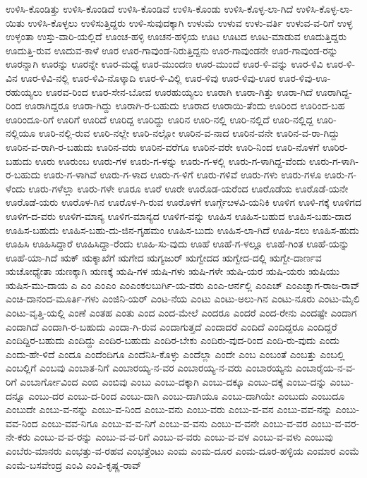 ಉಳಿಸಿ-ಕೊಂಡಿತ್ತು
ಉಳಿಸಿ-ಕೊಂಡಿದೆ
ಉಳಿಸಿ-ಕೊಂಡಿವೆ
ಉಳಿಸಿ-ಕೊಂಡು
ಉಳಿಸಿ-ಕೊಳ್ಳ-ಲಾ-ಗಿದೆ
ಉಳಿಸಿ-ಕೊಳ್ಳ-ಲಾ-ಯಿತು
ಉಳಿಸಿ-ಕೊಳ್ಳಲು
ಉಳಿಸುತ್ತಿದ್ದರು
ಉಳಿ-ಸುವುದಕ್ಕಾಗಿ
ಉಳುಮೆ
ಉಳುವ
ಉಳು-ವರ್ತಿ
ಉಳುವ-ವ-ರಿಗೆ
ಉಳ್ಳ
ಉಳ್ಳಂತಾ
ಉಸ್ತು-ವಾರಿ-ಯಲ್ಲಿದೆ
ಊಂಚ-ಹಳ್ಳಿ
ಊಚನ-ಹಳ್ಳಿಯ
ಊಟ
ಊಟದ
ಊಟ-ಮಾಡುವ
ಊದುತ್ತಿದ್ದರು
ಊದುತ್ತಿ-ರುವ
ಊದುವ-ಕಾಳೆ
ಊರ
ಊರ-ಗಾವುಂಡ-ನಿರುತ್ತಿದ್ದನು
ಊರ-ಗಾವುಂಡನೇ
ಊರ-ಗಾವುಂಡ-ರನ್ನು
ಊರನ್ನಾಗಿ
ಊರನ್ನು
ಊರನ್ನೇ
ಊರ-ಮಧ್ಯೆ
ಊರ-ಮುಂದಣ
ಊರ-ಮುಂದೆ
ಊರ-ಳಿ-ವನ್ನು
ಊರ-ಳಿವಿ
ಊರ-ಳಿ-ವಿನ
ಊರ-ಳಿವಿ-ನಲ್ಲಿ
ಊರ-ಳಿವಿ-ನೊಳ್ಕಾದಿ
ಊರ-ಳಿ-ವಿಲ್ಲಿ
ಊರ-ಳಿವು
ಊರ-ಳಿವು-ಊರ
ಊರ-ಳಿವು-ಊ-ರಹುಯ್ಯಲು
ಊರವ-ರಿಂದ
ಊರ-ಸೇನ-ಬೋವ
ಊರಹುಯ್ಯಲು
ಊರಾಗಿ
ಊರಾ-ಗಿತ್ತು
ಊರಾ-ಗಿದೆ
ಊರಾಗಿದ್ದ-ರಿಂದ
ಊರಾಗಿದ್ದರೂ
ಊರಾ-ಗಿದ್ದು
ಊರಾಗಿ-ರ-ಬಹುದು
ಊರಾದ
ಊರಾಯಿ-ತೆಂದು
ಊರಿಂದ
ಊರಿಂದ-ಬಹ
ಊರಿಂದೂ-ರಿಗೆ
ಊರಿಗೆ
ಊರಿದೆ
ಊರಿದ್ದ
ಊರಿದ್ದು
ಊರಿನ
ಊರಿ-ನಲ್ಲಿ
ಊರಿ-ನಲ್ಲಿದೆ
ಊರಿ-ನಲ್ಲಿದ್ದ
ಊರಿ-ನಲ್ಲಿಯೂ
ಊರಿ-ನಲ್ಲಿ-ರುವ
ಊರಿ-ನಲ್ಲೇ
ಊರಿ-ನಲ್ಲೋ
ಊರಿನ-ವ-ನಾದ
ಊರಿನ-ವನೇ
ಊರಿನ-ವ-ರಾ-ಗಿದ್ದು
ಊರಿನ-ವ-ರಾಗಿ-ರ-ಬಹುದು
ಊರಿನ-ವರು
ಊರಿನ-ವರೆಗೂ
ಊರಿನ-ವರೇ
ಊರಿ-ನಿಂದ
ಊರಿ-ನೊಳಗೆ
ಊರಿರ-ಬಹುದು
ಊರು
ಊರುಂಬ
ಊರು-ಗಳ
ಊರು-ಗ-ಳನ್ನು
ಊರು-ಗ-ಳಲ್ಲಿ
ಊರು-ಗ-ಳಾಗಿದ್ದ-ವೆಂದು
ಊರು-ಗ-ಳಾಗಿ-ರ-ಬಹುದು
ಊರು-ಗ-ಳಾಗಿವೆ
ಊರು-ಗ-ಳಾದ
ಊರು-ಗ-ಳಿಗೆ
ಊರು-ಗಳಿವೆ
ಊರು-ಗಳು
ಊರು-ಗಳೂ
ಊರು-ಗ-ಳೆಂದು
ಊರು-ಗಳೆಲ್ಲಾ
ಊರು-ಗಳೇ
ಊರೂ
ಊರೆ
ಊರೇ
ಊರೊಡ-ಯರೆಂದ
ಊರೊಡೆಯ
ಊರೊಡೆ-ಯನೇ
ಊರೊಡೆ-ಯರು
ಊರೊಳ-ಗಿನ
ಊರೊಳ-ಗಿ-ರುವ
ಊರೊಳಗೆ
ಊರ್ಗ್ಗೆೞಳವಿ-ಯನಿಕಿ
ಊಳಿಗ
ಊಳಿ-ಗಕ್ಕೆ
ಊಳಿಗದ
ಊಳಿಗ-ದ-ವರು
ಊಳಿಗ-ಮಾನ್ಯ
ಊಳಿಗ-ಮಾನ್ಯದ
ಊಳಿಗ-ವನ್ನು
ಊಹಿಸ
ಊಹಿಸ-ಬಹುದ
ಊಹಿಸ-ಬಹು-ದಾದ
ಊಹಿಸ-ಬಹುದು
ಊಹಿಸ-ಬಹು-ದು-ಜಿನ-ಗೃಹಮಂ
ಊಹಿಸ-ಬುದು
ಊಹಿಸ-ಲಾ-ಗಿದೆ
ಊಹಿ-ಸಲು
ಊಹಿಸ-ಹುದು
ಊಹಿಸಿ
ಊಹಿಸಿದ್ದಾರೆ
ಊಹಿಸಿದ್ದಾ-ರೆಂದು
ಊಹಿ-ಸು-ವುದು
ಊಹೆ
ಊಹೆ-ಗ-ಳಲ್ಲೂ
ಊಹೆ-ಗಿಂತ
ಊಹೆ-ಯನ್ನು
ಊಹೆ-ಯಾ-ಗಿದೆ
ಋಕ್
ಋಕ್ಶಾಖೆಗೆ
ಋಗೇದ
ಋಗ್ಯಜುರ್
ಋಗ್ವೇದದ
ಋಗ್ವೇದ-ದಲ್ಲಿ
ಋಗ್ವೇ-ದಾರ್ಣವ
ಋಚೋಧ್ಯೇತಾ
ಋಣಕ್ಕಾಗಿ
ಋಣಕ್ಕೆ
ಋಷಿ-ಗಳ
ಋಷಿ-ಗಳು
ಋಷಿ-ಗಳೇ
ಋಷಿ-ಯರ
ಋಷಿ-ಯರು
ಋಷಿಯು
ಋಷಿಸ-ಮು-ದಾಯ
ಎ
ಎಂ
ಎಂಎಂ
ಎಂಎಂಕಲಬುರ್ಗಿ-ಯ-ವರು
ಎಂಎ-ಆರ್ನಲ್ಲಿ
ಎಂಎಚ್
ಎಂಎಚ್ನಾಗ-ರಾಜ-ರಾವ್
ಎಂಚಿ-ದಾನಂದ-ಮೂರ್ತಿ-ಗಳು
ಎಂಜಿನಿ-ಯರ್
ಎಂಟ-ನೆಯ
ಎಂಟು
ಎಂಟು-ಅಲು-ಗಿನ
ಎಂಟು-ನೂರು
ಎಂಟು-ಮೈಲಿ
ಎಂಟು-ವೃತ್ತಿ-ಯಲ್ಲಿ
ಎಂಣೆ
ಎಂತಹ
ಎಂತು
ಎಂದ
ಎಂದ-ಮೇಲೆ
ಎಂದರೂ
ಎಂದರೆ
ಎಂದ-ರೇನು
ಎಂದಷ್ಟೇ
ಎಂದಾಗ
ಎಂದಾಗಿದೆ
ಎಂದಾಗಿ-ರ-ಬಹುದು
ಎಂದಾ-ಗಿ-ರುವ
ಎಂದಾಗುತ್ತದೆ
ಎಂದಾದರೆ
ಎಂದಿದೆ
ಎಂದಿದ್ದರೂ
ಎಂದಿದ್ದರೆ
ಎಂದಿದ್ದಿರ-ಬಹುದು
ಎಂದಿದ್ದು
ಎಂದಿರ-ಬಹುದು
ಎಂದಿರ-ಬೇಕು
ಎಂದಿರು-ವುದ-ರಿಂದ
ಎಂದಿ-ರು-ವುದು
ಎಂದು
ಎಂದು-ಹೇ-ಳಿದೆ
ಎಂದೂ
ಎಂದೆಂದಿಗೂ
ಎಂದೆನಿಸಿ-ಕೊಳ್ಳು
ಎಂದೆಲ್ಲಾ
ಎಂದೇ
ಎಂಬ
ಎಂಬಂತೆ
ಎಂಬತ್ತು
ಎಂಬಲ್ಲಿ
ಎಂಬಲ್ಲಿಗೆ
ಎಂಬವು
ಎಂಬಾತ-ನಿಗೆ
ಎಂಬಾರಯ್ಯ-ನ-ವರ
ಎಂಬಾರಯ್ಯ-ನ-ವರು
ಎಂಬಾರಯ್ಯನು
ಎಂಬಾರೈಯ-ನ-ವ-ರಿಗೆ
ಎಂಬಾರ್ಗೋವಿಂದ
ಎಂಬಿ
ಎಂಬಿವು
ಎಂಬು
ಎಂಬು-ದಕ್ಕಾಗಿ
ಎಂಬು-ದಕ್ಕೂ
ಎಂಬು-ದಕ್ಕೆ
ಎಂಬು-ದನ್ನು
ಎಂಬು-ದನ್ನೂ
ಎಂಬು-ದರ
ಎಂಬು-ದ-ರಿಂದ
ಎಂಬು-ದಾಗಿ
ಎಂಬು-ದಾಗಿಯೂ
ಎಂಬು-ದಾಗಿಯೇ
ಎಂಬುದು
ಎಂಬುದೂ
ಎಂಬುದೇ
ಎಂಬು-ವ-ನನ್ನು
ಎಂಬು-ವ-ನಿಂದ
ಎಂಬು-ವನು
ಎಂಬು-ವರು
ಎಂಬು-ವ-ವನ
ಎಂಬು-ವವ-ನನ್ನು
ಎಂಬು-ವವ-ನಿಂದ
ಎಂಬು-ವವ-ನಿಗೂ
ಎಂಬು-ವ-ವ-ನಿಗೆ
ಎಂಬು-ವ-ವನು
ಎಂಬು-ವ-ವನೇ
ಎಂಬು-ವ-ವರ
ಎಂಬು-ವ-ವರ-ನೇ-ಕರು
ಎಂಬು-ವ-ವ-ರನ್ನು
ಎಂಬು-ವ-ವ-ರಿಗೆ
ಎಂಬು-ವ-ವರು
ಎಂಬು-ವ-ವಳ
ಎಂಬು-ವ-ವಳು
ಎಂಬುವು
ಎಂಬೆರು-ಮಾನರು
ಎಂಭತ್ತು-ವ-ರಹವ
ಎಂಭತ್ತೆಂಟು
ಎಂಮ
ಎಂಮ-ದೂರ
ಎಂಮ-ದೂರ-ಹಳ್ಳಿಯ
ಎಂಮಾರ
ಎಂಮೆ
ಎಂಮೆ-ಬಸವೇಂದ್ರ
ಎಂವಿ
ಎಂವಿ-ಕೃಷ್ಣ-ರಾವ್
